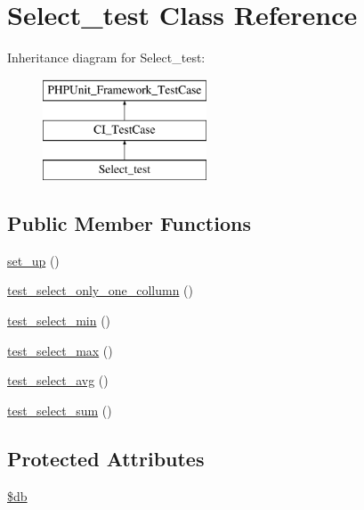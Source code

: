 \hypertarget{class_select__test}{}\section{Select\+\_\+test Class Reference}
\label{class_select__test}
Inheritance diagram for Select\+\_\+test\+:\begin{figure}[H]
\begin{center}
\leavevmode
\includegraphics[height=3.000000cm]{class_select__test}
\end{center}
\end{figure}
\subsection*{Public Member Functions}
\begin{DoxyCompactItemize}
\item 
\hyperlink{class_select__test_a69829875c8d4b6ce94908445c4155741}{set\+\_\+up} ()
\item 
\hyperlink{class_select__test_a1b2b53bf761ff6112015a83a41f6912d}{test\+\_\+select\+\_\+only\+\_\+one\+\_\+collumn} ()
\item 
\hyperlink{class_select__test_a5aa1119b0bb344a78fbcb09a812bef6a}{test\+\_\+select\+\_\+min} ()
\item 
\hyperlink{class_select__test_ac8aada452334720bc53487b4b1f62e05}{test\+\_\+select\+\_\+max} ()
\item 
\hyperlink{class_select__test_ab27eb062408b7da77bcd9f5d19998c55}{test\+\_\+select\+\_\+avg} ()
\item 
\hyperlink{class_select__test_aa42ba8ee4bf7d33f085f5d8fc7c56fd2}{test\+\_\+select\+\_\+sum} ()
\end{DoxyCompactItemize}
\subsection*{Protected Attributes}
\begin{DoxyCompactItemize}
\item 
\hyperlink{class_select__test_a1fa3127fc82f96b1436d871ef02be319}{\$db}
\end{DoxyCompactItemize}
